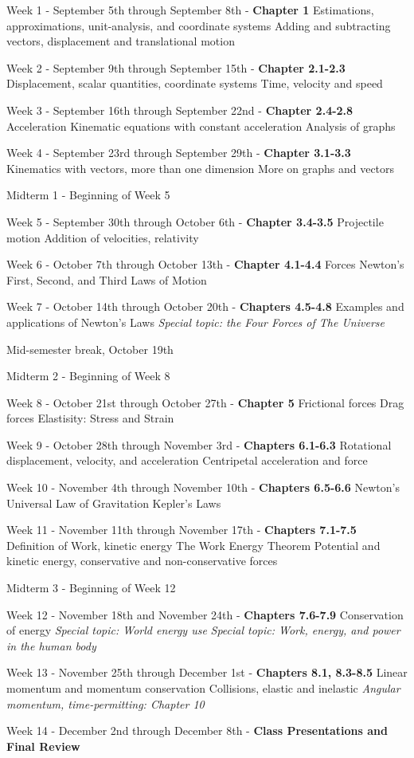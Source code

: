 \documentclass[10pt]{article}
\begin{document}
\begin{outline}[enumerate]
\1 Week 1 - September 5th through September 8th - \textbf{Chapter 1}
\2 Estimations, approximations, unit-analysis, and coordinate systems
\2 Adding and subtracting vectors, displacement and translational motion

\1 Week 2 - September 9th through September 15th - \textbf{Chapter 2.1-2.3}
\2 Displacement, scalar quantities, coordinate systems
\2 Time, velocity and speed

\1 Week 3 - September 16th through September 22nd - \textbf{Chapter 2.4-2.8}
\2 Acceleration
\2 Kinematic equations with constant acceleration
\2 Analysis of graphs

\1 Week 4 - September 23rd through September 29th - \textbf{Chapter 3.1-3.3}
\2 Kinematics with vectors, more than one dimension
\2 More on graphs and vectors

\1 Midterm 1 - Beginning of Week 5

\1 Week 5 - September 30th through October 6th - \textbf{Chapter 3.4-3.5}
\2 Projectile motion
\2 Addition of velocities, relativity

\1 Week 6 - October 7th through October 13th - \textbf{Chapter 4.1-4.4}
\2 Forces
\2 Newton's First, Second, and Third Laws of Motion

\1 Week 7 - October 14th through October 20th - \textbf{Chapters 4.5-4.8}
\2 Examples and applications of Newton's Laws
\2 \textit{Special topic: the Four Forces of The Universe}

\1 Mid-semester break, October 19th

\1 Midterm 2 - Beginning of Week 8

\1 Week 8 - October 21st through October 27th - \textbf{Chapter 5}
\2 Frictional forces
\2 Drag forces
\2 Elastisity: Stress and Strain

\1 Week 9 - October 28th through November 3rd - \textbf{Chapters 6.1-6.3}
\2 Rotational displacement, velocity, and acceleration
\2 Centripetal acceleration and force

\1 Week 10 - November 4th through November 10th - \textbf{Chapters 6.5-6.6}
\2 Newton's Universal Law of Gravitation
\2 Kepler's Laws

\1 Week 11 - November 11th through November 17th - \textbf{Chapters 7.1-7.5}
\2 Definition of Work, kinetic energy
\2 The Work Energy Theorem
\2 Potential and kinetic energy, conservative and non-conservative forces

\1 Midterm 3 - Beginning of Week 12

\1 Week 12 - November 18th and November 24th - \textbf{Chapters 7.6-7.9}
\2 Conservation of energy
\2 \textit{Special topic: World energy use}
\2 \textit{Special topic: Work, energy, and power in the human body}

\1 Week 13 - November 25th through December 1st  - \textbf{Chapters 8.1, 8.3-8.5}
\2 Linear momentum and momentum conservation
\2 Collisions, elastic and inelastic
\2 \textit{Angular momentum, time-permitting: Chapter 10}

\1 Week 14 - December 2nd through December 8th - \textbf{Class Presentations and Final Review}
\end{outline}
\end{document}
